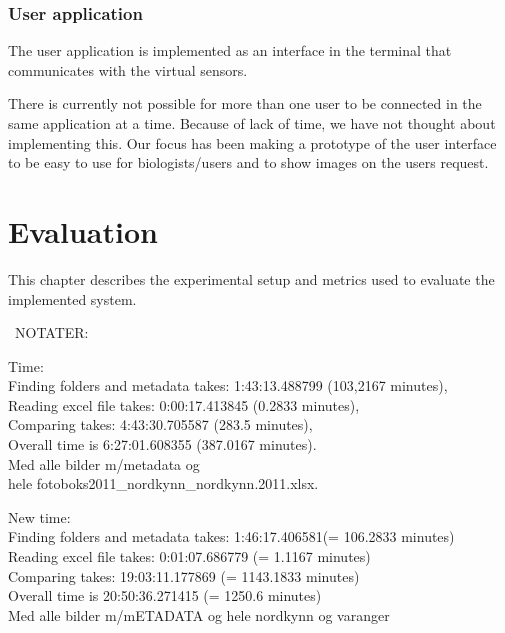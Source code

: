 \documentclass[USenglish]{uit-thesis}
\begin{document}
\subsection{User application} \label{ssec:user}
The user application is implemented as an interface in the terminal that communicates with the virtual sensors.

There is currently not possible for more than one user to be connected in the same application at a time. Because of lack of time, we have not thought about implementing this. Our focus has been making a prototype of the user interface to be easy to use for biologists/users and to show images on the users request.


\chapter{Evaluation} \label{chap:evaluation}
This chapter describes the experimental setup and metrics used to evaluate the implemented system. 


\iffalse
\ NOTATER:

\item Time: \\
Finding folders and metadata takes:  1:43:13.488799 (103,2167 minutes), \\
Reading excel file takes:  0:00:17.413845 (0.2833 minutes),\\
Comparing takes:  4:43:30.705587 (283.5 minutes),\\
Overall time is  6:27:01.608355 (387.0167 minutes).\\
Med alle bilder m/metadata og \\
hele fotoboks2011\_nordkynn\_nordkynn.2011.xlsx.

\item New time: \\
Finding folders and metadata takes:  1:46:17.406581(= 106.2833 minutes) \\
Reading excel file takes:  0:01:07.686779 (= 1.1167 minutes) \\
Comparing takes:  19:03:11.177869 (= 1143.1833 minutes) \\
Overall time is  20:50:36.271415 (= 1250.6 minutes) \\
Med alle bilder m/mETADATA og hele nordkynn og varanger
\end{document}
